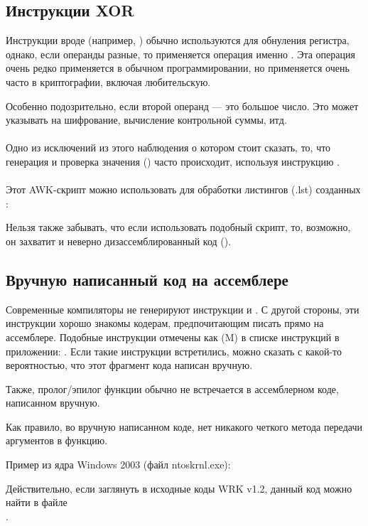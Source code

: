 
\subsection{Инструкции XOR}

Инструкции вроде  (например, ) 
обычно используются для обнуления регистра,
однако, если операнды разные, то применяется операция именно .
Эта операция очень редко применяется в обычном программировании, но применяется очень часто в криптографии,
включая любительскую.

Особенно подозрительно, если второй операнд --- это большое число.
Это может указывать на шифрование, вычисление контрольной суммы, итд.  \\
\\
Одно из исключений из этого наблюдения о котором стоит сказать, то, что генерация и проверка значения 
() часто происходит, используя инструкцию \XOR.  \\
\\
Этот AWK-скрипт можно использовать для обработки листингов (.lst) созданных \IDA{}:



Нельзя также забывать,
что если использовать подобный скрипт, то, возможно, он захватит и неверно дизассемблированный
код 
().

\subsection{Вручную написанный код на ассемблере}

Современные компиляторы не генерируют инструкции  и . 
С другой стороны, эти инструкции хорошо знакомы кодерам, предпочитающим писать прямо на ассемблере. 
Подобные инструкции отмечены как (M) в списке инструкций в приложении: 
.
Если такие инструкции встретились, можно сказать с какой-то вероятностью, что этот фрагмент кода написан вручную.

\par
Также, пролог/эпилог функции обычно не встречается в ассемблерном коде, написанном вручную.

\par
Как правило, во вручную написанном коде, нет никакого четкого метода передачи аргументов в функцию.

\par
Пример из ядра Windows 2003 
(файл ntoskrnl.exe):



Действительно, если заглянуть в исходные коды 
\ac{WRK} v1.2, данный код можно найти в файле \\
.
